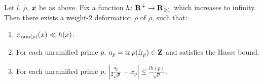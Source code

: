 \begin{theorem}\label{thm:master-Galois}
Let $l$, $\bar\rho$, ${\boldsymbol x}$ be as above. Fix a function 
$h\colon \mathbf{R}^+ \to \mathbf{R}_{\geqslant 1}$ which increases to infinity. Then there 
exists a weight-$2$ deformation $\rho$ of $\bar\rho$, such that: 
\begin{enumerate}
\item
$\pi_{\mathrm{ram}(\rho)}(x) \ll h(x)$. 

\item
For each unramified prime $p$, $a_p=\operatorname{tr}\rho(\mathrm{fr}_p)\in \mathbf{Z}$ and satisfies the 
Hasse bound. 

\item
For each unramified prime $p$, 
$\left| \frac{a_p}{2\sqrt p} - x_p\right| \leqslant \frac{l h(p)}{\sqrt p}$. 
\end{enumerate}
\end{theorem}
